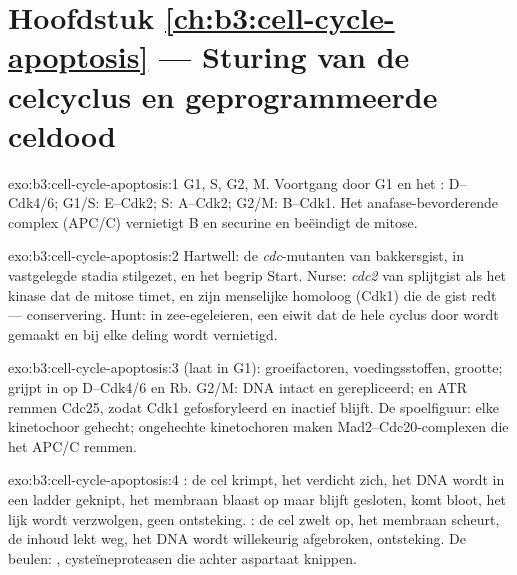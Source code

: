 \section*{Hoofdstuk \ref{ch:b3:cell-cycle-apoptosis} --- Sturing van de celcyclus en geprogrammeerde celdood}

\begin{solution}{exo:b3:cell-cycle-apoptosis:1}
G1, S, G2, M. Voortgang door G1 en het : 
D--Cdk4/6; G1/S:  E--Cdk2; S:  A--Cdk2; G2/M: 
B--Cdk1. Het anafase-bevorderende complex (APC/C) vernietigt  B
en securine en beëindigt de mitose.
\end{solution}

\begin{solution}{exo:b3:cell-cycle-apoptosis:2}
Hartwell: de \emph{cdc}-mutanten van bakkersgist, in vastgelegde stadia
stilgezet, en het begrip Start. Nurse: \emph{cdc2} van splijtgist als
het kinase dat de mitose timet, en zijn menselijke homoloog (Cdk1) die
de gist redt --- conservering. Hunt:  in zee-egeleieren, een
eiwit dat de hele cyclus door wordt gemaakt en bij elke deling wordt
vernietigd.
\end{solution}

\begin{solution}{exo:b3:cell-cycle-apoptosis:3}
 (laat in G1): groeifactoren, voedingsstoffen, grootte;
grijpt in op  D--Cdk4/6 en Rb. G2/M: DNA intact en
gerepliceerd;  en ATR remmen Cdc25, zodat Cdk1 gefosforyleerd en
inactief blijft. De spoelfiguur: elke kinetochoor gehecht; ongehechte
kinetochoren maken Mad2--Cdc20-complexen die het APC/C remmen.
\end{solution}

\begin{solution}{exo:b3:cell-cycle-apoptosis:4}
: de cel krimpt, het  verdicht zich, het DNA wordt in
een ladder geknipt, het membraan blaast op maar blijft gesloten,
 komt bloot, het lijk wordt verzwolgen, geen ontsteking.
: de cel zwelt op, het membraan scheurt, de inhoud lekt weg, het
DNA wordt willekeurig afgebroken, ontsteking. De beulen: ,
cysteïneproteasen die achter aspartaat knippen.
\end{solution}

